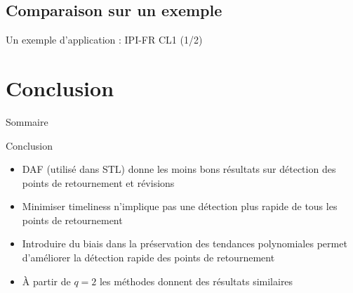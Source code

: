 \documentclass[10pt,xcolor=table,color={dvipsnames,usenames},ignorenonframetext,usepdftitle=false,french]{beamer}
\providecommand{\tightlist}{%
  \setlength{\parskip}{0pt}
  }
\newcommand\1{\mathds{1}}
\begin{document}
\hypertarget{comparaison-sur-un-exemple}{%
\subsection{Comparaison sur un
exemple}\label{comparaison-sur-un-exemple}}

\begin{frame}{Un exemple d'application : IPI-FR CL1 (1/2)}
\protect\hypertarget{un-exemple-dapplication-ipi-fr-cl1-12}{}
\end{frame}

\hypertarget{conclusion}{%
\section{Conclusion}\label{conclusion}}

\begin{frame}[noframenumbering]{Sommaire}
\protect\hypertarget{sommaire-3}{}
\end{frame}

\begin{frame}{Conclusion}
\protect\hypertarget{conclusion-1}{}
\begin{itemize}
\tightlist
\item
  DAF (utilisé dans STL) donne les moins bons résultats sur détection
  des points de retournement et révisions
\end{itemize}

\bigskip

\begin{itemize}
\tightlist
\item
  Minimiser timeliness n'implique pas une détection plus rapide de tous
  les points de retournement
\end{itemize}

\bigskip

\begin{itemize}
\tightlist
\item
  Introduire du biais dans la préservation des tendances polynomiales
  permet d'améliorer la détection rapide des points de retournement
\end{itemize}

\bigskip \pause

\begin{itemize}
\tightlist
\item
  À partir de \(q=2\) les méthodes donnent des résultats similaires
\end{itemize}
\end{frame}
\end{document}
